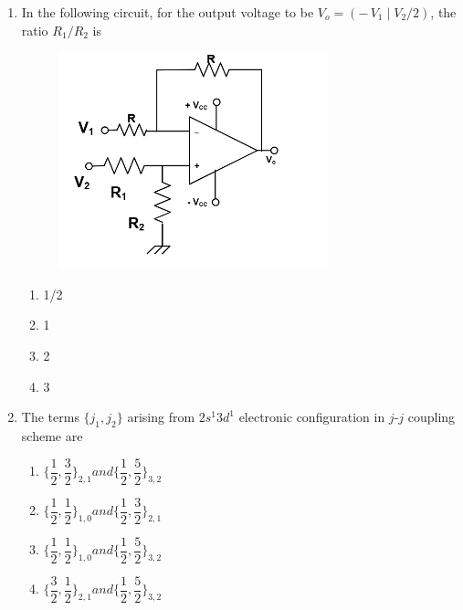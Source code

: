 \documentclass[journal,12pt,onecolumn]{IEEEtran}
\theoremstyle{remark}
\begin{document}
\begin{enumerate}
\begin{center}
\begin{tabular}{@{}p{0.45\linewidth}p{0.45\linewidth}@{}}
\end{tabular}
\end{center}
\begin{enumerate}
   
\end{enumerate}


\item In the following circuit, for the output voltage to be $V_{o}=(-\,V_{1}\;|\;V_{2}/2)$, the ratio $R_1/R_2$ is
\begin{figure}[H]
    \centering
    \includegraphics[width = 0.6\columnwidth]{fig/Q31.png}
    \caption*{}
    \label{fig:Q31}
\end{figure}

\begin{multicols}{4}
\begin{enumerate}
\item 1/2
\item 1
\item 2
\item 3
\end{enumerate}
\end{multicols}

\item The terms $\{j_{1},j_{2}\}$ arising from $2s^{1}3d^{1}$ electronic configuration in $j$-$j$ coupling scheme are
\begin{multicols}{2}
\begin{enumerate}
\item $\bigl\{\dfrac{1}{2},\dfrac{3}{2}\bigr\}_{2,1} and \bigl\{\dfrac{1}{2},\dfrac{5}{2}\bigr\}_{3,2}$
\item $\bigl\{\dfrac{1}{2},\dfrac{1}{2}\bigr\}_{1,0}  and  \bigl\{\dfrac{1}{2},\dfrac{3}{2}\bigr\}_{2,1}$
\item $\bigl\{\dfrac{1}{2},\dfrac{1}{2}\bigr\}_{1,0} and   \bigl\{\dfrac{1}{2},\dfrac{5}{2}\bigr\}_{3,2}$
\item $\bigl\{\dfrac{3}{2},\dfrac{1}{2}\bigr\}_{2,1} and \bigl\{\dfrac{1}{2},\dfrac{5}{2}\bigr\}_{3,2}$
\end{enumerate}
\end{multicols}


\end{enumerate}
\end{document}
